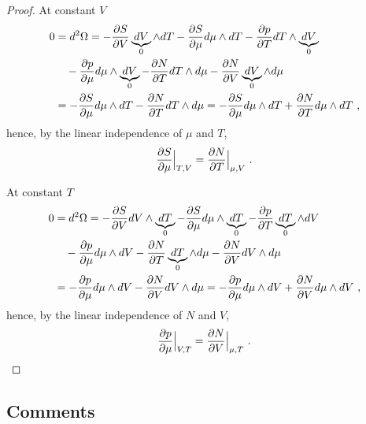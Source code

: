 \begin{proof}
        At constant $V$ 
        \begin{equation*}
        \begin{aligned}
            0 & = d^2 \Omega = - \frac{\partial S}{\partial V} \underbrace{dV}_0 \wedge dT - \frac{\partial S}{\partial\mu} d\mu \wedge dT - \frac{\partial p}{\partial T} dT \wedge \underbrace{dV}_0 \\ & \quad - \frac{\partial p}{\partial\mu} d\mu \wedge \underbrace{dV}_0 - \frac{\partial N}{\partial T} dT \wedge d\mu - \frac{\partial N}{\partial V} \underbrace{dV}_0 \wedge d\mu \\ & = - \frac{\partial S}{\partial\mu} d\mu \wedge dT - \frac{\partial N}{\partial T} dT \wedge d\mu = - \frac{\partial S}{\partial\mu} d\mu \wedge dT + \frac{\partial N}{\partial T} d\mu \wedge dT ~,
        \end{aligned}
        \end{equation*}
        hence, by the linear independence of $\mu$ and $T$,
        \begin{equation*}
            \frac{\partial S}{\partial\mu} \Big \vert_{T,V} = \frac{\partial N}{\partial T} \Big \vert_{\mu,V} ~.
        \end{equation*}

        At constant $T$ 
        \begin{equation*}
        \begin{aligned}
            0 & = d^2 \Omega = - \frac{\partial S}{\partial V} dV \wedge \underbrace{dT}_0 - \frac{\partial S}{\partial\mu} d\mu \wedge \underbrace{dT}_0 - \frac{\partial p}{\partial T} \underbrace{dT}_0 \wedge dV \\ & \quad - \frac{\partial p}{\partial\mu} d\mu \wedge dV - \frac{\partial N}{\partial T} \underbrace{dT}_0 \wedge d\mu - \frac{\partial N}{\partial V} dV \wedge d\mu \\ & = - \frac{\partial p}{\partial\mu} d\mu \wedge dV - \frac{\partial N}{\partial V} dV \wedge d\mu=  - \frac{\partial p}{\partial\mu} d\mu \wedge dV + \frac{\partial N}{\partial V} d\mu \wedge dV ~,
        \end{aligned}
        \end{equation*}
        hence, by the linear independence of $N$ and $V$,
        \begin{equation*}
            \frac{\partial p}{\partial\mu} \Big \vert_{V,T} = \frac{\partial N}{\partial V} \Big \vert_{\mu, T} ~.
        \end{equation*}
    \end{proof}

\subsection{Comments}

